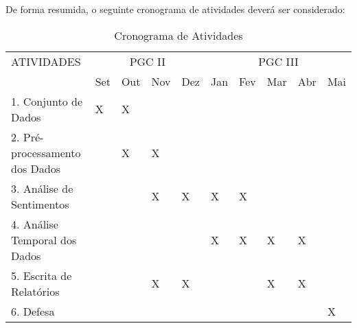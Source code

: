 De forma resumida, o seguinte cronograma de atividades deverá ser considerado:

\begin{table}[H]
\centering
{\footnotesize
\doublespacing
\begin{tabular}{|p{6.1cm}|l|l|l|l|l|l|l|l|l|}
\hline
\multirow{}{}{ATIVIDADES}
& \multicolumn{4}{c|}{PGC II} & \multicolumn{5}{c|}{PGC III} \\ \cline{2-10}
& Set  & Out  & Nov  & Dez & Jan & Fev & Mar & Abr & Mai \\ \hline
1. Conjunto de Dados                   & X  & X &  &  &   &   &   &  &       \\ \hline
2. Pré-processamento dos Dados                         &   & X  & X  &   &  &  &  &    &         \\ \hline
3. Análise de Sentimentos               
 &  &   & X & X & X & X &  &  &  \\ 
 \hline
4. Análise Temporal dos Dados                                   &     &     &     &     & X   & X   & X    &  X  &       \\ \hline
5. Escrita de Relatórios                                    &     &     &  X  &  X  &    &    & X   & X   &      \\ \hline
6. Defesa                                    &     &     &    &    &    &    &    &    & X     \\ \hline

\end{tabular}}
\caption{Cronograma de Atividades}
\label{tab:cronograma}
\end{table}

